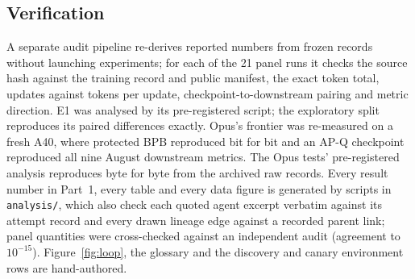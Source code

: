 \documentclass{article}
\newif\ifshowhumanmarkers \showhumanmarkersfalse
\newcommand{\humantag}[1]{{\color{humanframe}\sffamily\scriptsize\bfseries HUMAN AUTHOR MUST REWRITE/VERIFY [#1]}\ }
\newcommand{\humanauthor}[2][]{\ifshowhumanmarkers\begin{humanbox}\humantag{#1}#2\end{humanbox}\else #2\par\fi}
\newcommand{\humancaption}[1]{\ifshowhumanmarkers\humantag{#1}\fi}
\begin{document}
\subsection{Verification}\label{sec:verification}
\humanauthor[P2-07]{A separate audit pipeline re-derives reported numbers from frozen records without launching experiments; for each of the 21 panel runs it checks the source hash against the training record and public manifest, the exact token total, updates against tokens per update, checkpoint-to-downstream pairing and metric direction. E1 was analysed by its pre-registered script; the exploratory split reproduces its paired differences exactly. Opus's frontier was re-measured on a fresh A40, where protected BPB reproduced bit for bit and an AP-Q checkpoint reproduced all nine August downstream metrics. The Opus tests' pre-registered analysis reproduces byte for byte from the archived raw records. Every result number in Part~1, every table and every data figure is generated by scripts in \texttt{analysis/}, which also check each quoted agent excerpt verbatim against its attempt record and every drawn lineage edge against a recorded parent link; \CRNCrossChecked{} panel quantities were cross-checked against an independent audit (agreement to $10^{-15}$). Figure~\ref{fig:loop}, the glossary and the discovery and canary environment rows are hand-authored.}

\begin{table}[t]
\caption{\humancaption{P2-08}Selection funnel from discovery to the reported recipes, in time order. Step 2's rule was fixed before the first AutoPareto attempt; steps 3 and 4 were chosen after the agents' scores (and, for step 4, the seeds 0--2 re-runs) were known; step 5 was pre-registered. Counts and dates: Appendix Table~\ref{tab:funnelfull}.}\label{tab:funnel}
\centering\scriptsize\setlength{\tabcolsep}{3pt}
\end{table}
\end{document}
